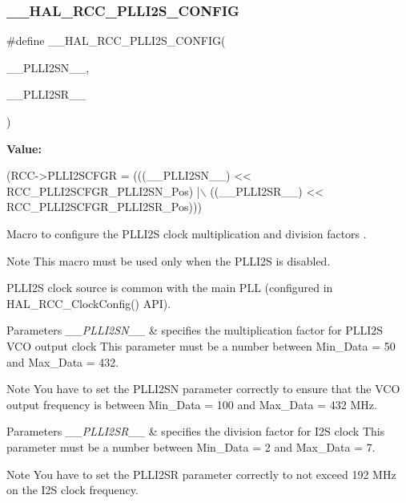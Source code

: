 \subsubsection{\texorpdfstring{\+\_\+\+\_\+\+H\+A\+L\+\_\+\+R\+C\+C\+\_\+\+P\+L\+L\+I2\+S\+\_\+\+C\+O\+N\+F\+IG}{\_\_HAL\_RCC\_PLLI2S\_CONFIG}}
{\footnotesize\ttfamily \#define \+\_\+\+\_\+\+H\+A\+L\+\_\+\+R\+C\+C\+\_\+\+P\+L\+L\+I2\+S\+\_\+\+C\+O\+N\+F\+IG(\begin{DoxyParamCaption}\item[{}]{\+\_\+\+\_\+\+P\+L\+L\+I2\+S\+N\+\_\+\+\_\+,  }\item[{}]{\+\_\+\+\_\+\+P\+L\+L\+I2\+S\+R\+\_\+\+\_\+ }\end{DoxyParamCaption})}

{\bfseries Value\+:}
\begin{DoxyCode}
(RCC->PLLI2SCFGR = (((\_\_PLLI2SN\_\_) << RCC\_PLLI2SCFGR\_PLLI2SN\_Pos)  |\(\backslash\)
                               ((\_\_PLLI2SR\_\_) << RCC\_PLLI2SCFGR\_PLLI2SR\_Pos)))
\end{DoxyCode}


Macro to configure the P\+L\+L\+I2S clock multiplication and division factors . 

\begin{DoxyNote}{Note}
This macro must be used only when the P\+L\+L\+I2S is disabled. 

P\+L\+L\+I2S clock source is common with the main P\+LL (configured in H\+A\+L\+\_\+\+R\+C\+C\+\_\+\+Clock\+Config() A\+PI). 
\end{DoxyNote}

\begin{DoxyParams}{Parameters}
{\em \+\_\+\+\_\+\+P\+L\+L\+I2\+S\+N\+\_\+\+\_\+} & specifies the multiplication factor for P\+L\+L\+I2S V\+CO output clock This parameter must be a number between Min\+\_\+\+Data = 50 and Max\+\_\+\+Data = 432. \\
\hline
\end{DoxyParams}
\begin{DoxyNote}{Note}
You have to set the P\+L\+L\+I2\+SN parameter correctly to ensure that the V\+CO output frequency is between Min\+\_\+\+Data = 100 and Max\+\_\+\+Data = 432 M\+Hz.
\end{DoxyNote}

\begin{DoxyParams}{Parameters}
{\em \+\_\+\+\_\+\+P\+L\+L\+I2\+S\+R\+\_\+\+\_\+} & specifies the division factor for I2S clock This parameter must be a number between Min\+\_\+\+Data = 2 and Max\+\_\+\+Data = 7. \\
\hline
\end{DoxyParams}
\begin{DoxyNote}{Note}
You have to set the P\+L\+L\+I2\+SR parameter correctly to not exceed 192 M\+Hz on the I2S clock frequency. 
\end{DoxyNote}
